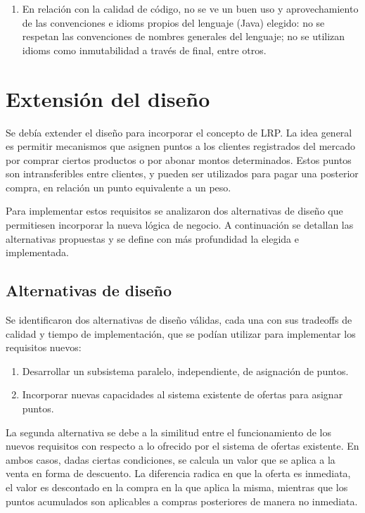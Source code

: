 \documentclass[a4paper,11pt]{article}
\begin{document}
\begin{enumerate}
  \item En relación con la calidad de código, no se ve un buen uso y
    aprovechamiento de las convenciones e idioms propios del lenguaje (Java)
    elegido: no se respetan las convenciones de nombres generales del lenguaje;
    no se utilizan idioms como inmutabilidad a través de final, entre otros.

\end{enumerate}

\section{Extensión del diseño}

Se debía extender el diseño para incorporar el concepto de LRP. La idea general
es permitir mecanismos que asignen puntos a los clientes registrados del
mercado por comprar ciertos productos o por abonar montos determinados. Estos
puntos son intransferibles entre clientes, y pueden ser utilizados para pagar
una posterior compra, en relación un punto equivalente a un peso.

Para implementar estos requisitos se analizaron dos alternativas de diseño que
permitiesen incorporar la nueva lógica de negocio. A continuación se detallan
las alternativas propuestas y se define con más profundidad la elegida e
implementada.

\subsection{Alternativas de diseño}

Se identificaron dos alternativas de diseño válidas, cada una con sus tradeoffs
de calidad y tiempo de implementación, que se podían utilizar para implementar
los requisitos nuevos:

\begin{enumerate}

  \item Desarrollar un subsistema paralelo, independiente, de asignación de
    puntos.

  \item Incorporar nuevas capacidades al sistema existente de ofertas para
    asignar puntos.

\end{enumerate}

La segunda alternativa se debe a la similitud entre el funcionamiento de los
nuevos requisitos con respecto a lo ofrecido por el sistema de ofertas
existente. En ambos casos, dadas ciertas condiciones, se calcula un valor que
se aplica a la venta en forma de descuento. La diferencia radica en que la
oferta es inmediata, el valor es descontado en la compra en la que aplica la
misma, mientras que los puntos acumulados son aplicables a compras posteriores
de manera no inmediata.
\end{document}
